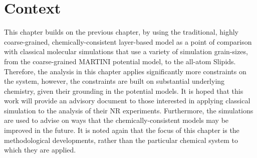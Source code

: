 \section*{Context}
This chapter builds on the previous chapter, by using the traditional, highly coarse-grained, chemically-consistent layer-based model as a point of comparison with classical molecular simulations that use a variety of simulation grain-sizes, from the coarse-grained MARTINI potential model, to the all-atom Slipids.
Therefore, the analysis in this chapter applies significantly more constraints on the system, however, the constraints are built on substantial underlying chemistry, given their grounding in the potential models.
It is hoped that this work will provide an advisory document to those interested in applying classical simulation to the analysis of their NR experiments.
Furthermore, the simulations are used to advise on ways that the chemically-consistent models may be improved in the future.
It is noted again that the focus of this chapter is the methodological developments, rather than the particular chemical system to which they are applied.
